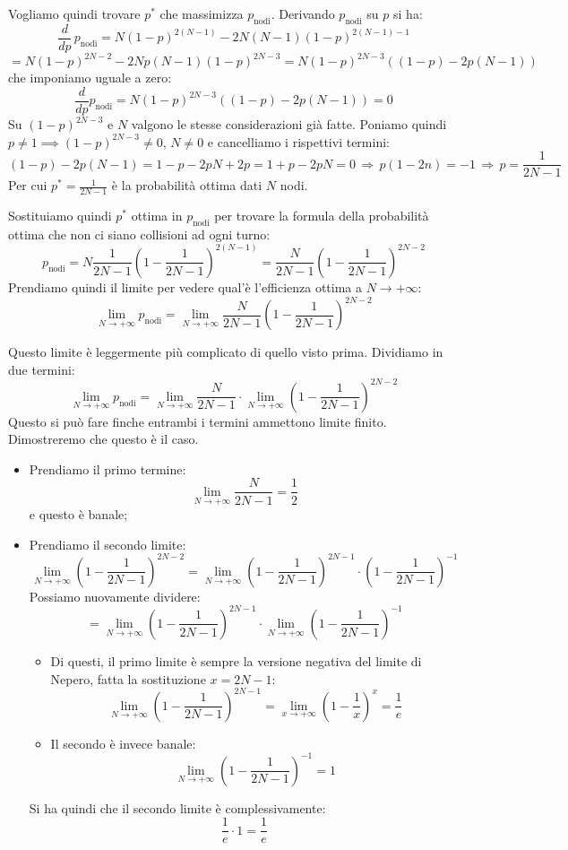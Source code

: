 \documentclass[a4paper,11pt]{article}
\begin{document}
Vogliamo quindi trovare $p^*$ che massimizza $p_\text{nodi}$.
Derivando $p_\text{nodi}$ su $p$ si ha:
$$
\frac{d}{dp} \, p_\text{nodi} = N (1 - p)^{2 (N - 1)} - 2 N  (N - 1) (1 - p)^{2(N - 1) - 1}
$$
$$
= N (1 - p)^{2N - 2} - 2 N p (N - 1) (1 - p)^{2N - 3}
= N (1 - p)^{2N - 3} \left( (1 - p) - 2 p (N - 1) \right)
$$
che imponiamo uguale a zero:
$$
\frac{d}{dp} p_\text{nodi} = N (1 - p)^{2N - 3} \left( (1 - p) - 2 p (N - 1) \right) = 0
$$
Su $(1 - p)^{2N - 3}$ e $N$ valgono le stesse considerazioni già fatte.
Poniamo quindi $p \neq 1 \implies (1 - p)^{2N - 3} \neq 0$, $N \neq 0$ e cancelliamo i rispettivi termini:
$$
(1 - p) - 2 p(N - 1) = 1 - p - 2 pN + 2 p = 1 + p - 2 pN = 0 \, \Rightarrow \, p(1 - 2n) = -1 \, \Rightarrow \, p = \frac{1}{2N - 1} 
$$
Per cui $p^* = \frac{1}{2N - 1}$ è la probabilità ottima dati $N$ nodi.

Sostituiamo quindi $p^*$ ottima in $p_\text{nodi}$ per trovare la formula della probabilità ottima che non ci siano collisioni ad ogni turno:
$$
p_\text{nodi} = N \frac{1}{2N - 1} \left( 1 - \frac{1}{2N - 1} \right)^{2 (N - 1)} = \frac{N}{2N - 1} \left( 1 - \frac{1}{2N - 1} \right)^{2N - 2}
$$
Prendiamo quindi il limite per vedere qual'è l'efficienza ottima a $N \rightarrow +\infty$:
$$
\lim_{N \rightarrow + \infty} p_{\text{nodi}} = \lim_{N \rightarrow + \infty} \frac{N}{2N - 1} \left( 1 - \frac{1}{2N - 1} \right)^{2N - 2}
$$

Questo limite è leggermente più complicato di quello visto prima. Dividiamo in due termini:
$$
\lim_{N \rightarrow + \infty} p_\text{nodi} = 
\lim_{N \rightarrow + \infty} \frac{N}{2N - 1} \cdot 
\lim_{N \rightarrow + \infty} \left( 1 - \frac{1}{2N - 1} \right)^{2N - 2}
$$
Questo si può fare finche entrambi i termini ammettono limite finito. Dimostreremo che questo è il caso.
\begin{itemize}
	\item Prendiamo il primo termine:
		$$
		\lim_{N \rightarrow + \infty} \frac{N}{2N - 1} = \frac{1}{2}
		$$
		e questo è banale;
	\item Prendiamo il secondo limite:
		$$
		\lim_{N \rightarrow + \infty} \left( 1 - \frac{1}{2N - 1} \right)^{2N - 2}
		= \lim_{N \rightarrow + \infty} \left( 1 - \frac{1}{2N - 1} \right)^{2N - 1} \cdot \left( 1 - \frac{1}{2N - 1} \right)^{-1}
		$$
		Possiamo nuovamente dividere:
		$$
		= \lim_{N \rightarrow + \infty} \left( 1 - \frac{1}{2N - 1} \right)^{2N - 1} \cdot \lim_{N \rightarrow + \infty} \left( 1 - \frac{1}{2N - 1} \right)^{-1}
		$$
		\begin{itemize}
			\item Di questi, il primo limite è sempre la versione negativa del limite di Nepero, fatta la sostituzione $x = 2N - 1$:
		$$
		\lim_{N \rightarrow + \infty} \left( 1 - \frac{1}{2N - 1} \right)^{2N - 1} = \lim_{x \rightarrow + \infty} \left( 1 - \frac{1}{x} \right)^{x} = \frac{1}{e}
		$$
	\item Il secondo è invece banale:
		$$
		\lim_{N \rightarrow + \infty} \left( 1 - \frac{1}{2N - 1} \right)^{-1} = 1
		$$
		\end{itemize}
		Si ha quindi che il secondo limite è complessivamente:
		$$
		\frac{1}{e} \cdot 1 = \frac{1}{e}
		$$
\end{itemize}
\end{document}
